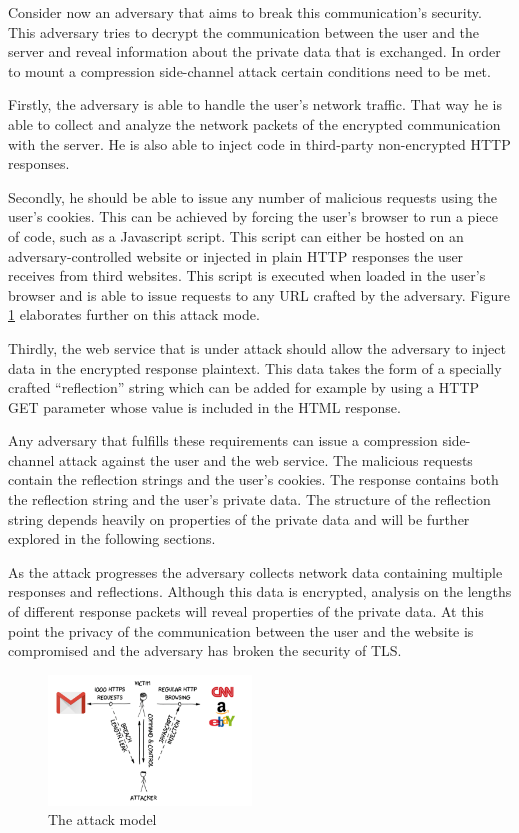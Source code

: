 \documentclass[conference, letterpaper, 10pt]{IEEEtran}
\begin{document}
Consider now an adversary that aims to break this communication's security.
This adversary tries to decrypt the communication between
the user and the server and reveal information about the private data that is
exchanged. In order to mount a compression side-channel attack certain
conditions need to be met.

Firstly, the adversary is able to handle the user's network traffic. That way he
is able to collect and analyze the network packets of the encrypted
communication with the server. He is also able to inject code in third-party
non-encrypted HTTP responses.

Secondly, he should be able to issue any number of malicious requests using the
user's cookies. This can be achieved by forcing the user's browser to run a
piece of code, such as a Javascript script. This script can either be hosted on
an adversary-controlled website or injected in plain HTTP responses the user
receives from third websites. This script is executed when loaded in the user's
browser and is able to issue requests to any URL crafted by the adversary.
Figure \ref{fig:attack_model} elaborates further on this attack mode.

Thirdly, the web service that is under attack should allow the adversary to
inject data in the encrypted response plaintext. This data takes the form of a
specially crafted ``reflection'' string which can be added for example by using a
HTTP GET parameter whose value is included in the HTML response.

Any adversary that fulfills these requirements can issue a compression
side-channel attack against the user and the web service. The malicious requests
contain the reflection strings and the user's cookies. The response contains
both the reflection string and the user's private data. The structure of the
reflection string depends heavily on properties of the private data and will be
further explored in the following sections.

As the attack progresses the adversary collects network data containing multiple
responses and reflections. Although this data is encrypted, analysis on the
lengths of different response packets will reveal properties of the private data.
At this point the privacy of the communication between the user and the website is
compromised and the adversary has broken the security of TLS.

    \begin{figure}[thpb]
        \centering
            \includegraphics[width=0.48\textwidth]{attack_model.png}
        \caption{The attack model}
        \label{fig:attack_model}
    \end{figure}
\end{document}

